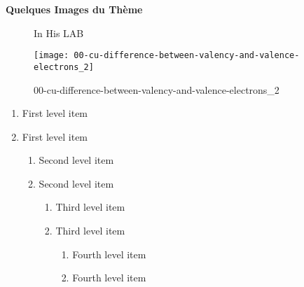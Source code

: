 \documentclass[../main.tex]{subfiles}
\begin{document}
\textbf{ Quelques Images du Thème}
    \begin{figure}[bh]
        \centering
                \caption{In His LAB}
        \texttt{[image: 00-cu-difference-between-valency-and-valence-electrons\_2]} 
         \caption{00-cu-difference-between-valency-and-valence-electrons_2}
        \label{fig:img1}
            \end{figure}
    
    \begin{enumerate}
   \item First level item
   \item First level item
   \begin{enumerate}
     \item Second level item
     \item Second level item
     \begin{enumerate}
       \item Third level item
       \item Third level item
       \begin{enumerate}
         \item Fourth level item
         \item Fourth level item
       \end{enumerate}
     \end{enumerate}
   \end{enumerate}
 \end{enumerate}
    
    
\end{document}

